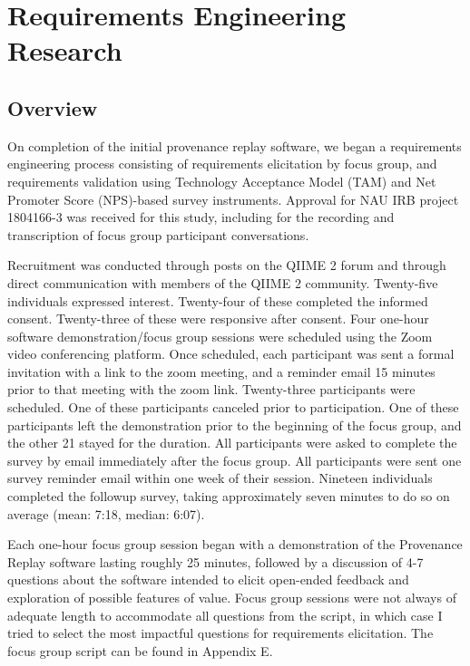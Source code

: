 \chapter{Requirements Engineering Research}

\section{Overview}

On completion of the initial provenance replay software, we began a requirements
engineering process consisting of requirements elicitation by focus group, and
requirements validation using Technology Acceptance Model (TAM) \parencite{davis_perceived_1989}
and Net Promoter Score \parencite{reichheld_one_2003} (NPS)-based survey
instruments. Approval for NAU IRB project 1804166-3 was received for this study,
including for the recording and transcription of focus group participant
conversations.

Recruitment was conducted through posts on the QIIME 2 forum and through direct
communication with members of the QIIME 2 community. Twenty-five individuals
expressed interest. Twenty-four of these completed the informed consent.
Twenty-three of these were responsive after consent. Four one-hour software
demonstration/focus group sessions were scheduled using the Zoom video
conferencing platform. Once scheduled, each participant was sent a formal
invitation with a link to the zoom meeting, and a reminder email 15 minutes
prior to that meeting with the zoom link. Twenty-three participants were
scheduled. One of these participants canceled prior to participation. One of
these participants left the demonstration prior to the beginning of the focus
group, and the other 21 stayed for the duration. All participants were asked to
complete the survey by email immediately after the focus group. All participants
were sent one survey reminder email within one week of their session. Nineteen
individuals completed the followup survey, taking approximately seven minutes to
do so on average (mean: 7:18, median: 6:07).

Each one-hour focus group session began with a demonstration of the Provenance
Replay software lasting roughly 25 minutes, followed by a discussion of 4-7
questions about the software intended to elicit open-ended feedback and
exploration of possible features of value. Focus group sessions were not always
of adequate length to accommodate all questions from the script, in which case I
tried to select the most impactful questions for requirements elicitation. The
focus group script can be found in Appendix E.

